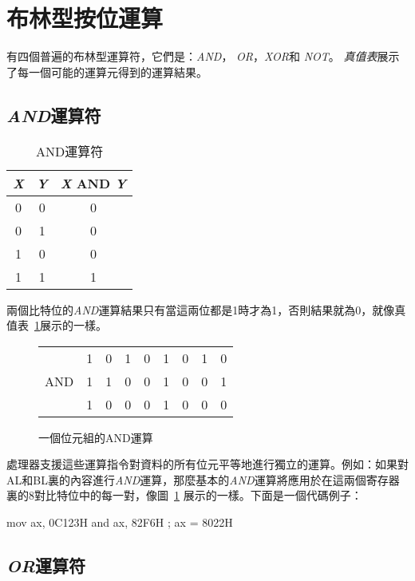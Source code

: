 \section{布林型按位運算}

有四個普遍的布林型運算符，它們是：\emph{AND}，
\emph{OR}，\emph{XOR}和 \emph{NOT}。
\emph{真值表}展示了每一個可能的運算元得到的運算結果。

\subsection{\emph{AND}運算符}

\begin{table}[t]
\centering
\begin{tabular}{|c|c|c|}
\hline
\emph{X} & \emph{Y} & \emph{X} AND \emph{Y} \\
\hline \hline
0 & 0 & 0 \\
0 & 1 & 0 \\
1 & 0 & 0 \\
1 & 1 & 1 \\
\hline
\end{tabular}
\caption{AND運算符 \label{tab:and} }
\end{table}

兩個比特位的\emph{AND}運算結果只有當這兩位都是1時才為1，否則結果就為0，就像真值表~\ref{tab:and}展示的一樣。

\begin{figure}[t]
\centering
\begin{tabular}{rcccccccc}
    & 1 & 0 & 1 & 0 & 1 & 0 & 1 & 0 \\
AND & 1 & 1 & 0 & 0 & 1 & 0 & 0 & 1 \\
\hline
    & 1 & 0 & 0 & 0 & 1 & 0 & 0 & 0
\end{tabular}
\caption{一個位元組的AND運算 \label{fig:and}}
\end{figure}

處理器支援這些運算指令對資料的所有位元平等地進行獨立的運算。例如：如果對{\code AL}和{\code BL}裏的內容進行\emph{AND}運算，那麼基本的\emph{AND}運算將應用於在這兩個寄存器裏的8對比特位中的每一對，像圖~\ref{fig:and} 展示的一樣。下面是一個代碼例子：
\begin{AsmCodeListing}[frame=none]
      mov    ax, 0C123H
      and    ax, 82F6H          ; ax = 8022H
\end{AsmCodeListing}

\subsection{\emph{OR}運算符}


